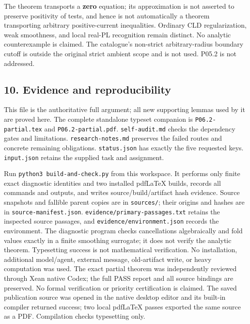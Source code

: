 \documentclass[
  11pt,
]{article}
\begin{document}
The theorem transports a \textbf{zero} equation; its approximation is
not asserted to preserve positivity of tests, and hence is not
automatically a theorem transporting arbitrary positive-current
inequalities. Ordinary CLD regularization, weak smoothness, and local
real-PL recognition remain distinct. No analytic counterexample is
claimed. The catalogue's non-strict arbitrary-radius boundary cutoff is
outside the original strict ambient scope and is not used. P05.2 is not
addressed.

\subsection{10. Evidence and
reproducibility}\label{evidence-and-reproducibility}

This file is the authoritative full argument; all new supporting lemmas
used by it are proved here. The complete standalone typeset companion is
\texttt{P06.2-partial.tex} and \texttt{P06.2-partial.pdf}.
\texttt{self-audit.md} checks the dependency gates and limitations.
\texttt{research-notes.md} preserves the failed routes and concrete
remaining obligations. \texttt{status.json} has exactly the five
requested keys. \texttt{input.json} retains the supplied task and
assignment.

Run \texttt{python3\ build-and-check.py} from this workspace. It
performs only finite exact diagnostic identities and two installed
pdfLaTeX builds, records all commands and outputs, and writes
source/build/artifact hash evidence. Source snapshots and fallible
parent copies are in \texttt{sources/}; their origins and hashes are in
\texttt{source-manifest.json}. \texttt{evidence/primary-passages.txt}
retains the inspected source passages, and
\texttt{evidence/environment.json} records the environment. The
diagnostic program checks cancellations algebraically and fold values
exactly in a finite smoothing surrogate; it does not verify the analytic
theorem. Typesetting success is not mathematical verification. No
installation, additional model/agent, external message, old-artifact
write, or heavy computation was used. The exact partial theorem was independently reviewed through Xean native
Codex; the full PASS report and all source bindings are preserved.
No formal verification or priority certification is claimed. The saved
publication source was opened in the native desktop editor and its
built-in compiler returned success; two local pdfLaTeX passes exported
the same source as a PDF. Compilation checks typesetting only.
\end{document}
